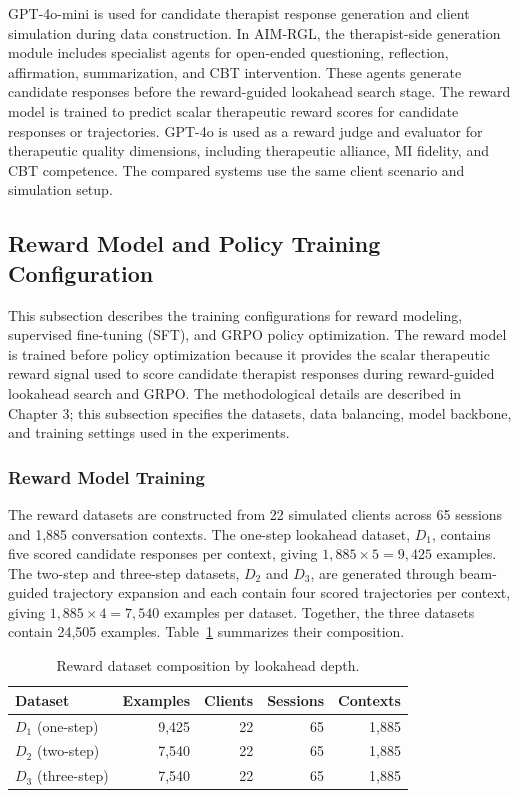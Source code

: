 GPT-4o-mini is used for candidate therapist response generation and client simulation during data construction. In AIM-RGL, the therapist-side generation module includes specialist agents for open-ended questioning, reflection, affirmation, summarization, and CBT intervention. These agents generate candidate responses before the reward-guided lookahead search stage. The reward model is trained to predict scalar therapeutic reward scores for candidate responses or trajectories. GPT-4o is used as a reward judge and evaluator for therapeutic quality dimensions, including therapeutic alliance, MI fidelity, and CBT competence. The compared systems use the same client scenario and simulation setup.

\subsection{Reward Model and Policy Training Configuration}

This subsection describes the training configurations for reward modeling, supervised fine-tuning (SFT), and GRPO policy optimization. The reward model is trained before policy optimization because it provides the scalar therapeutic reward signal used to score candidate therapist responses during reward-guided lookahead search and GRPO. The methodological details are described in Chapter 3; this subsection specifies the datasets, data balancing, model backbone, and training settings used in the experiments.

\subsubsection{Reward Model Training}

The reward datasets are constructed from 22 simulated clients across 65 sessions and 1,885 conversation contexts. The one-step lookahead dataset, \(D_1\), contains five scored candidate responses per context, giving \(1{,}885 \times 5 = 9{,}425\) examples. The two-step and three-step datasets, \(D_2\) and \(D_3\), are generated through beam-guided trajectory expansion and each contain four scored trajectories per context, giving \(1{,}885 \times 4 = 7{,}540\) examples per dataset. Together, the three datasets contain 24,505 examples. Table~\ref{tab:reward-dataset-summary} summarizes their composition.

\begin{table}[htbp]
\centering
\caption{Reward dataset composition by lookahead depth.}
\label{tab:reward-dataset-summary}
\begin{tabular}{lrrrr}
\hline
Dataset & Examples & Clients & Sessions & Contexts \\
\hline
\(D_1\) (one-step) & 9,425 & 22 & 65 & 1,885 \\
\(D_2\) (two-step) & 7,540 & 22 & 65 & 1,885 \\
\(D_3\) (three-step) & 7,540 & 22 & 65 & 1,885 \\
\hline
\end{tabular}
\end{table}

